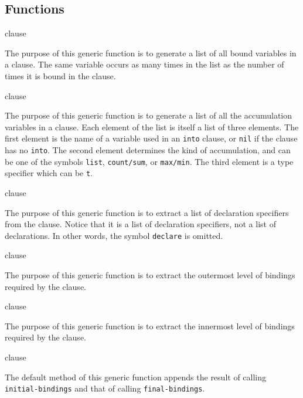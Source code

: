 \subsection{Functions}

 {clause}

The purpose of this generic function is to generate a list of all
bound variables in a clause.  The same variable occurs as many times
in the list as the number of times it is bound in the clause.

 {clause}

The purpose of this generic function is to generate a list of all the
accumulation variables in a clause.  Each element of the list is
itself a list of three elements.  The first element is the name of a
variable used in an \texttt{into} clause, or \texttt{nil} if the
clause has no \texttt{into}.  The second element determines the kind
of accumulation, and can be one of the symbols \texttt{list},
\texttt{count/sum}, or \texttt{max/min}.  The third element is a type
specifier which can be \texttt{t}.

 {clause}

The purpose of this generic function is to extract a list of
declaration specifiers from the clause.  Notice that it is a list of
declaration specifiers, not a list of declarations.  In other words,
the symbol \texttt{declare} is omitted.

 {clause}

The purpose of this generic function is to extract the outermost level
of bindings required by the clause.

 {clause}

The purpose of this generic function is to extract the innermost level
of bindings required by the clause.

 {clause}

The default method of this generic function appends the result of
calling \texttt{initial-bindings} and that of calling
\texttt{final-bindings}.
